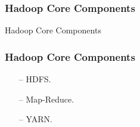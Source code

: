 \begin{frame}[c]{ }
	\frametitle{Hadoop Core Components }
	\centering     
	
	\textcolor{offgreen}{ \large Hadoop Core Components}
\end{frame}
\begin{frame}[c]{ }
	\frametitle{Hadoop Core Components }
	
	
	\begin{itemize}  [<+->]
		\item [--] HDFS.
		\item [--] Map-Reduce.
		\item [--] YARN.
		
	\end{itemize}
\end{frame}

